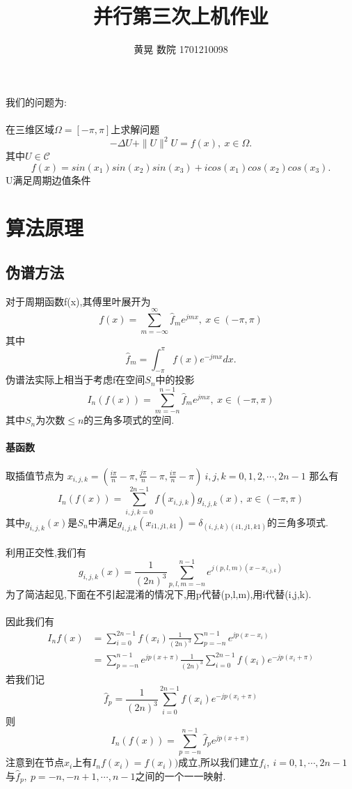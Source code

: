 \documentclass[UTF8]{ctexart}
\author{黄晃 数院 1701210098 }
\title{并行第三次上机作业}
\begin{document}
  \maketitle
我们的问题为:
\paragraph{}
在三维区域$\Omega =[-\pi,\pi]$上求解问题
$$
-\Delta U + \|U\|^{2}U = f(x),\ x\in \Omega.
$$
其中$U\in \mathcal{C}$
$$
f(x) = sin(x_1)sin(x_2)sin(x_3)+icos(x_1)cos(x_2)cos(x_3).
$$
U满足周期边值条件
\section{算法原理}
\subsection{伪谱方法}
对于周期函数f(x),其傅里叶展开为
$$
f(x) = \sum\limits _{m=-\infty }^{\infty}\hat{f}_{m}e^{jmx},\ x\in (-\pi,\pi)
$$
其中
$$
\hat{f}_{m}=\int_{-\pi}^{\pi}f(x)e^{-jmx}dx.
$$
伪谱法实际上相当于考虑f在空间$S_{n}$中的投影
$$
I_n(f(x)) = \sum\limits_{m=-n}^{n-1}\hat{f}_{m}e^{jmx},\ x\in (-\pi,\pi)
$$
其中$S_n$为次数$\leq n$的三角多项式的空间.
\paragraph{基函数}
取插值节点为
$x_{i,j,k}=(\frac{i\pi}{n}-\pi,\frac{j\pi}{n}-\pi,\frac{i\pi}{n}-\pi)\ i,j,k=0,1,2,\cdots,2n-1$
那么有
$$
I_n(f(x)) = \sum\limits_{i,j,k=0}^{2n-1}f(x_{i,j,k})g_{i,j,k}(x),\ x\in (-\pi,\pi)
$$
其中$g_{i,j,k}(x)$是$S_{n}$中满足$g_{i,j,k}(x_{i1,j1,k1})=\delta_{(i,j,k)(i1,j1,k1)}$的三角多项式.
\paragraph{}
利用正交性,我们有
$$
g_{i,j,k}(x) = \frac{1}{(2n)^3} \sum\limits_{p,l,m=-n}^{n-1}e^{j(p,l,m)(x-x_{i,j,k})}
$$
为了简洁起见,下面在不引起混淆的情况下,用p代替(p,l,m),用i代替(i,j,k).
\paragraph{}
因此我们有
\begin{equation}
 \begin{split}
 I_{n}f(x) &= \sum\limits_{i=0}^{2n-1}f(x_{i})\frac{1}{(2n)^3} \sum\limits_{p=-n}^{n-1}e^{jp(x-x_i)}     \\
   &= \sum\limits_{p=-n}^{n-1}e^{jp(x+\pi)} \frac{1}{(2n)^3} \sum\limits_{i=0}^{2n-1}f(x_{i})e^{-jp(x_i+\pi)}
 \end{split}
\end{equation}
若我们记
$$
\hat{f}_p = \frac{1}{(2n)^3} \sum\limits_{i=0}^{2n-1}f(x_{i})e^{-jp(x_i+\pi)}
$$
则
$$
I_n(f(x)) =  \sum\limits_{p=-n}^{n-1}\hat{f}_p e^{jp(x+\pi)}
$$
注意到在节点$x_{i}$上有$I_nf(x_i)=f(x_i))$成立,所以我们建立$f_i,\ i=0,1,\cdots,2n-1$与$\hat{f}_p,\ p=-n,-n+1,\cdots,n-1$之间的一个一一映射.
\end{document}

